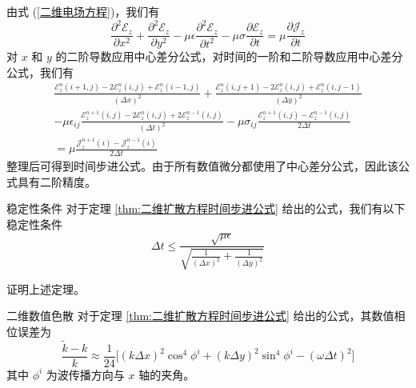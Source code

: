 \begin{solution}
    由式 (\ref{二维电场方程})，我们有
    \begin{equation*}
        \frac{\partial^2 \mathscr{E}_z}{\partial x^2}
        +\frac{\partial^2 \mathscr{E}_z}{\partial y^2}
        -\mu \epsilon \frac{\partial^2 \mathscr{E}_z}{\partial t^2}
        -\mu \sigma \frac{\partial \mathscr{E}_z}{\partial t}
        =\mu \frac{\partial \mathscr{J}_z}{\partial t}
    \end{equation*}
    对 $x$ 和 $y$ 的二阶导数应用中心差分公式，对时间的一阶和二阶导数应用中心差分公式，我们有
    \begin{equation*}
        \begin{gathered}
            \frac{\mathscr{E}_z^{n}(i+1,j)-2\mathscr{E}_z^n(i,j)+\mathscr{E}_z^{n}(i-1,j)}{(\Delta x)^2}
            +\frac{\mathscr{E}_z^{n}(i,j+1)-2\mathscr{E}_z^n(i,j)+\mathscr{E}_z^{n}(i,j-1)}{(\Delta y)^2}\\
            -\mu \epsilon_{ij} \frac{\mathscr{E}_z^{n+1}(i,j)-2\mathscr{E}_z^n(i,j)+2\mathscr{E}_z^{n-1}(i,j)}{(\Delta t)^2}
            -\mu \sigma_{ij} \frac{\mathscr{E}_z^{n+1}(i,j)-\mathscr{E}_z^{n-1}(i,j)}{2\Delta t}\\
            =\mu \frac{\mathscr{J}_z^{n+1}(i)-\mathscr{J}_z^{n-1}(i)}{2\Delta t}
        \end{gathered}
    \end{equation*}
    整理后可得到时间步进公式。由于所有数值微分都使用了中心差分公式，因此该公式具有二阶精度。
\end{solution}

\begin{theorem}{稳定性条件}
    对于定理 \ref{thm:二维扩散方程时间步进公式} 给出的公式，我们有以下稳定性条件
    \begin{equation}
        \Delta t \leq \frac{\sqrt{\mu \epsilon}}
        {\sqrt{\frac{1}{(\Delta x)^2}+\frac{1}{(\Delta y)^2}}}
    \end{equation}
\end{theorem}

\begin{exercise}
    证明上述定理。
\end{exercise}

\begin{theorem}{二维数值色散}
    对于定理 \ref{thm:二维扩散方程时间步进公式} 给出的公式，其数值相位误差为
    \begin{equation}
        \frac{\tilde{k}-k}{k}
        \approx\frac{1}{24}
        \Big[(k\Delta x)^2\cos^4\phi^i+(k\Delta y)^2\sin^4\phi^i-(\omega \Delta t)^2\Big]
    \end{equation}
    其中 $\phi^i$ 为波传播方向与 $x$ 轴的夹角。
\end{theorem}


